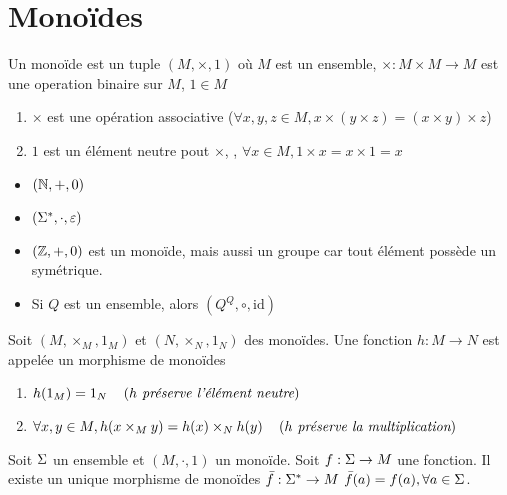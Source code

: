 \section{Monoïdes}

\begin{definition}[Monoïde]
	Un monoïde est un tuple $(M, \times, 1)$ où $M$ est un ensemble, $\times : M \times M \to M$ est une operation binaire sur $M$,
	$1\in M$ \tq
	\begin{enumerate}
		\item $\times$ est une opération  associative ($\forall x,y,z \in M , x \times (y \times z) = (x \times y) \times z$)
		\item $1$ est un élément neutre pout $\times$, \cad, $\forall x \in M, 1 \times x = x \times 1 = x$
	\end{enumerate}
\end{definition}

\begin{exemple}
	\begin{itemize}
		\item $(\mathbb{N}, +, 0)$
		\item $(\Sigma^{*}, \cdot, \varepsilon)$
		\item $(\mathbb{Z}, +, 0)$ est un monoïde, mais aussi un groupe car tout élément possède un symétrique.
		\item Si $Q$ est un ensemble, alors $(Q ^ Q, \circ, \text{id})$
	\end{itemize}
\end{exemple}


\begin{definition}
	Soit $(M,\times_M, 1_M)$ et $(N,\times_N, 1_N)$ des monoïdes. Une fonction $h :  M \to N$ est appelée un morphisme de monoïdes \ssi
	\begin{enumerate}
		\item $h(1_M) = 1_N \quad\left(\textit{$h$ préserve l'élément neutre}\right)$
		\item $\forall x, y \in M, h (x \times_M y) = h(x) \times_N h(y) \quad\left(\textit{$h$ préserve la multiplication}\right)$
	\end{enumerate}
\end{definition}


\begin{prop}
	Soit $\Sigma$ un ensemble et $(M,\cdot, 1)$ un monoïde. Soit $f : \Sigma \to M$ une fonction. Il existe
	un unique morphisme de monoïdes $\bar f : \Sigma^{*} \to M$ \tq $\bar f (a) =  f (a),  \forall a \in \Sigma$.

\end{prop}


